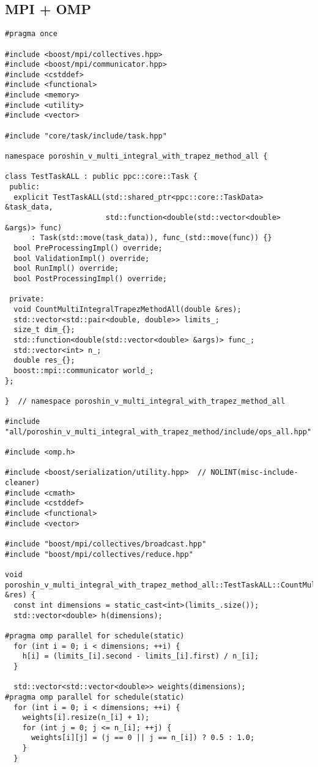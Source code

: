 \documentclass[12pt]{article}
\begin{document}
\subsection*{MPI + OMP}
\begin{lstlisting}
#pragma once

#include <boost/mpi/collectives.hpp>
#include <boost/mpi/communicator.hpp>
#include <cstddef>
#include <functional>
#include <memory>
#include <utility>
#include <vector>

#include "core/task/include/task.hpp"

namespace poroshin_v_multi_integral_with_trapez_method_all {

class TestTaskALL : public ppc::core::Task {
 public:
  explicit TestTaskALL(std::shared_ptr<ppc::core::TaskData> &task_data,
                       std::function<double(std::vector<double> &args)> func)
      : Task(std::move(task_data)), func_(std::move(func)) {}
  bool PreProcessingImpl() override;
  bool ValidationImpl() override;
  bool RunImpl() override;
  bool PostProcessingImpl() override;

 private:
  void CountMultiIntegralTrapezMethodAll(double &res);
  std::vector<std::pair<double, double>> limits_;
  size_t dim_{};
  std::function<double(std::vector<double> &args)> func_;
  std::vector<int> n_;
  double res_{};
  boost::mpi::communicator world_;
};

}  // namespace poroshin_v_multi_integral_with_trapez_method_all

#include "all/poroshin_v_multi_integral_with_trapez_method/include/ops_all.hpp"

#include <omp.h>

#include <boost/serialization/utility.hpp>  // NOLINT(misc-include-cleaner)
#include <cmath>
#include <cstddef>
#include <functional>
#include <vector>

#include "boost/mpi/collectives/broadcast.hpp"
#include "boost/mpi/collectives/reduce.hpp"

void poroshin_v_multi_integral_with_trapez_method_all::TestTaskALL::CountMultiIntegralTrapezMethodAll(double &res) {
  const int dimensions = static_cast<int>(limits_.size());
  std::vector<double> h(dimensions);

#pragma omp parallel for schedule(static)
  for (int i = 0; i < dimensions; ++i) {
    h[i] = (limits_[i].second - limits_[i].first) / n_[i];
  }

  std::vector<std::vector<double>> weights(dimensions);
#pragma omp parallel for schedule(static)
  for (int i = 0; i < dimensions; ++i) {
    weights[i].resize(n_[i] + 1);
    for (int j = 0; j <= n_[i]; ++j) {
      weights[i][j] = (j == 0 || j == n_[i]) ? 0.5 : 1.0;
    }
  }


\end{lstlisting}
\end{document}
